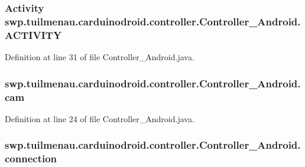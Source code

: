 \subsubsection[{A\+C\+T\+I\+V\+I\+T\+Y}]{\setlength{\rightskip}{0pt plus 5cm}Activity swp.\+tuilmenau.\+carduinodroid.\+controller.\+Controller\+\_\+\+Android.\+A\+C\+T\+I\+V\+I\+T\+Y}\label{classswp_1_1tuilmenau_1_1carduinodroid_1_1controller_1_1_controller___android_abcae66463bafe6a7ec0427e01150f653}


Definition at line 31 of file Controller\+\_\+\+Android.\+java.

\hypertarget{classswp_1_1tuilmenau_1_1carduinodroid_1_1controller_1_1_controller___android_ab8ea62ae40f4a2d48d4e66f2197edcf8}{}
\subsubsection[{cam}]{ swp.\+tuilmenau.\+carduinodroid.\+controller.\+Controller\+\_\+\+Android.\+cam}\label{classswp_1_1tuilmenau_1_1carduinodroid_1_1controller_1_1_controller___android_ab8ea62ae40f4a2d48d4e66f2197edcf8}


Definition at line 24 of file Controller\+\_\+\+Android.\+java.

\hypertarget{classswp_1_1tuilmenau_1_1carduinodroid_1_1controller_1_1_controller___android_adb291a2e455e66f5ef602f5df16af7a0}{}
\subsubsection[{connection}]{ swp.\+tuilmenau.\+carduinodroid.\+controller.\+Controller\+\_\+\+Android.\+connection}\label{classswp_1_1tuilmenau_1_1carduinodroid_1_1controller_1_1_controller___android_adb291a2e455e66f5ef602f5df16af7a0}


